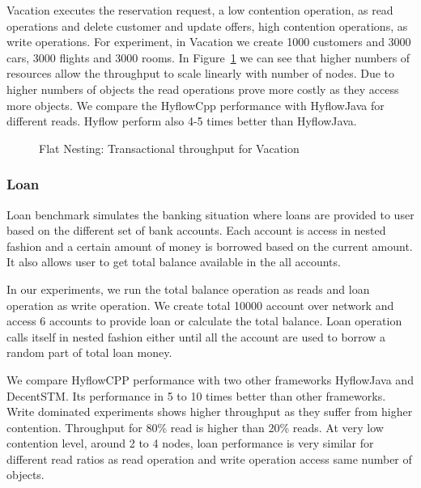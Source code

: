 \documentclass[12pt,english]{report}
\begin{document}
Vacation executes the reservation request, a low contention operation, as read operations and delete customer and update offers, high contention operations, as write operations. For experiment, in Vacation we create 1000 customers and 3000 cars, 3000 flights and 3000 rooms. In Figure~\ref{Fig:flatVacation} we can see  that higher numbers of resources allow the throughput to scale linearly with number of nodes. Due to higher numbers of objects the read operations prove more costly as they access more objects. We compare the HyflowCpp performance with HyflowJava for different reads. Hyflow perform also 4-5 times better than HyflowJava. 

\begin{figure}[H]
\centering
{}
\qquad
{}
\end{figure}

\begin{figure}[H]
\caption{Flat Nesting: Transactional throughput for Vacation}
\label{Fig:flatVacation}
\end{figure}

\subsubsection{Loan}

Loan benchmark simulates the banking situation where loans are provided to user based on the different set of bank accounts. Each account is access in nested fashion and a certain amount of money is borrowed based on the current amount. It also allows user to get total balance available in the all accounts.

In our experiments, we run the total balance operation as reads and loan operation as write operation. We create total 10000 account over network and access 6 accounts to provide loan or calculate the total balance.
Loan operation calls itself in nested fashion either until all the account are used to borrow a random part of total loan money.

We compare HyflowCPP performance with two other frameworks HyflowJava and DecentSTM. Its performance in 5 to 10 times better than other frameworks. Write dominated experiments shows higher throughput as they suffer from higher contention. Throughput for 80\% read is higher than 20\% reads. At very low contention level, around 2 to 4 nodes, loan performance is very similar for different read ratios as read operation and write operation access same number of objects. 
\end{document}
